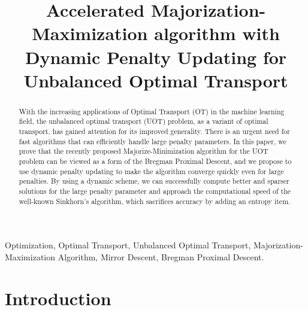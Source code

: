 \documentclass[conference]{IEEEtran}
\begin{document}
\title{Accelerated Majorization-Maximization algorithm with Dynamic Penalty Updating for Unbalanced Optimal Transport}

\author{
\and
{}

}

\maketitle

\begin{abstract}
With the increasing applications of Optimal Transport (OT) in the machine learning field, the unbalanced optimal transport (UOT) problem, as a variant of optimal transport, has gained attention for its improved generality. There is an urgent need for fast algorithms that can efficiently handle large penalty parameters. In this paper, we prove that the recently proposed Majorize-Minimization algorithm for the UOT problem can be viewed as a form of the Bregman Proximal Descent, and we propose to use dynamic penalty updating to make the algorithm converge quickly even for large penalties. By using a dynamic scheme, we can successfully compute better and sparser solutions for the large penalty parameter and approach the computational speed of the well-known Sinkhorn's algorithm, which sacrifices accuracy by adding an entropy item.
\end{abstract}

\begin{IEEEkeywords}
Optimization, Optimal Transport, Unbalanced Optimal Transport, Majorization-Maximization Algorithm, Mirror Descent, Bregman Proximal Descent.
\end{IEEEkeywords}

\section{Introduction}
\label{sec:int}
\end{document}
